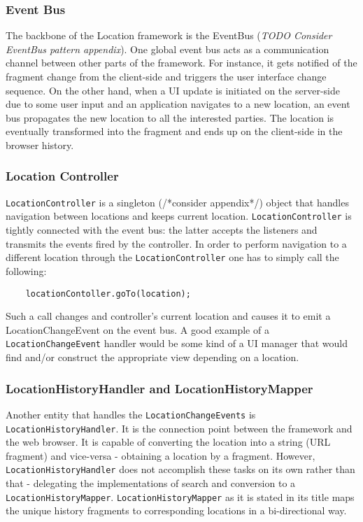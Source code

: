 \subsubsection{Event Bus}
 The backbone of the Location framework is the EventBus
(\emph{TODO Consider EventBus pattern appendix}). One global event bus acts as a communication
channel between other parts of the framework. For instance, it gets notified of
the fragment change from the client-side and triggers the user interface
change sequence. On the other hand, when a UI update is initiated on the
server-side due to some user input and an application navigates to a new
location, an event bus propagates the new location to all the interested
parties. The location is eventually transformed into the fragment and ends up on
the client-side in the browser history.

\subsubsection{Location Controller} \texttt{LocationController} is a singleton
(/*consider appendix*/) object that handles navigation between locations and keeps
current location. \texttt{LocationController} is tightly
connected with the event bus:
the latter accepts the listeners and transmits the events fired by the
controller. In order to perform navigation to a different location through the
\texttt{LocationController} one has to simply call the following:

\begin{lstlisting}
	locationContoller.goTo(location);
\end{lstlisting}

Such a call changes and controller's current location and causes it to emit a
LocationChangeEvent on the event bus. A good example of a
\texttt{LocationChangeEvent} handler would be some kind of a UI manager that
would find and/or construct the appropriate view depending on a location.

\subsubsection{LocationHistoryHandler and LocationHistoryMapper} 
Another entity that handles the \texttt{LocationChangeEvents} is
\texttt{LocationHistoryHandler}.
It is the connection point between the framework and the web browser. It is
capable of converting the location into a string (URL fragment) and vice-versa -
obtaining a location by a fragment. However, \texttt{LocationHistoryHandler}
does not accomplish these tasks on its own rather than that - delegating the
implementations of search and conversion to a \texttt{LocationHistoryMapper}.
\texttt{LocationHistoryMapper} as it is stated in its title maps the unique
history fragments to corresponding locations in a bi-directional way.


